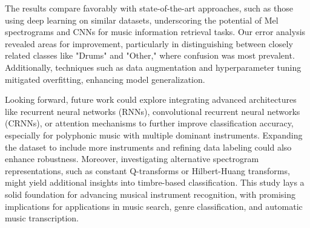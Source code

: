 \documentclass[conference]{IEEEtran}
\begin{document}
The results compare favorably with state-of-the-art approaches, such as those using deep learning on similar datasets, underscoring the potential of Mel spectrograms and CNNs for music information retrieval tasks. Our error analysis revealed areas for improvement, particularly in distinguishing between closely related classes like "Drums" and "Other," where confusion was most prevalent. Additionally, techniques such as data augmentation and hyperparameter tuning mitigated overfitting, enhancing model generalization.

Looking forward, future work could explore integrating advanced architectures like recurrent neural networks (RNNs), convolutional recurrent neural networks (CRNNs), or attention mechanisms to further improve classification accuracy, especially for polyphonic music with multiple dominant instruments. Expanding the dataset to include more instruments and refining data labeling could also enhance robustness. Moreover, investigating alternative spectrogram representations, such as constant Q-transforms or Hilbert-Huang transforms, might yield additional insights into timbre-based classification. This study lays a solid foundation for advancing musical instrument recognition, with promising implications for applications in music search, genre classification, and automatic music transcription.
\end{document}
